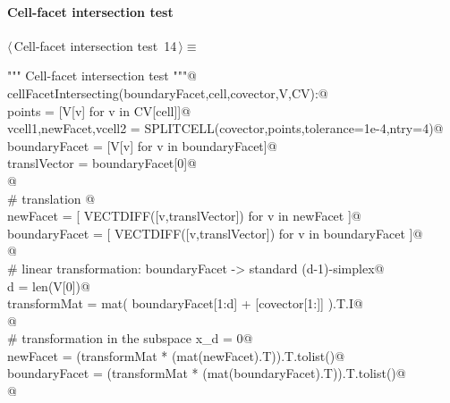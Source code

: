 \documentclass[11pt,oneside]{article}	%
\begin{document}
\paragraph{Cell-facet intersection test}

\begin{flushleft} \small \label{scrap15}
\protect{}$\langle\,$Cell-facet intersection test\nobreak\ {\footnotesize 14}$\,\rangle\equiv$
\vspace{-1ex}
\begin{list}{}{} \item
\mbox{}\verb@""" Cell-facet intersection test """@\\
\mbox{}\verb@def cellFacetIntersecting(boundaryFacet,cell,covector,V,CV):@\\
\mbox{}\verb@   points = [V[v] for v in CV[cell]]@\\
\mbox{}\verb@   vcell1,newFacet,vcell2 = SPLITCELL(covector,points,tolerance=1e-4,ntry=4)@\\
\mbox{}\verb@   boundaryFacet = [V[v] for v in boundaryFacet]@\\
\mbox{}\verb@   translVector = boundaryFacet[0]@\\
\mbox{}\verb@   @\\
\mbox{}\verb@   # translation @\\
\mbox{}\verb@   newFacet = [ VECTDIFF([v,translVector]) for v in newFacet ]@\\
\mbox{}\verb@   boundaryFacet = [ VECTDIFF([v,translVector]) for v in boundaryFacet ]@\\
\mbox{}\verb@   @\\
\mbox{}\verb@   # linear transformation: boundaryFacet -> standard (d-1)-simplex@\\
\mbox{}\verb@   d = len(V[0])@\\
\mbox{}\verb@   transformMat = mat( boundaryFacet[1:d] + [covector[1:]] ).T.I@\\
\mbox{}\verb@   @\\
\mbox{}\verb@   # transformation in the subspace x_d = 0@\\
\mbox{}\verb@   newFacet = (transformMat * (mat(newFacet).T)).T.tolist()@\\
\mbox{}\verb@   boundaryFacet = (transformMat * (mat(boundaryFacet).T)).T.tolist()@\\
\mbox{}\verb@   @\\

\end{list}
\end{flushleft}
\end{document}
